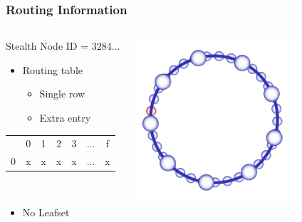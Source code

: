 \documentclass[xcolor=pdftex,dvipsnames,table]{beamer}
\begin{document}
\begin{frame}
    \frametitle{Routing Information}

    \begin{columns}

    \column{5.5cm}
    \begin{overlayarea}{\textwidth}{1\textheight}
    Stealth Node ID = 3284...

    \begin{itemize}
        \item{Routing table}
        \begin{itemize}
            \item{Single row}
            \item{Extra entry}
        \end{itemize}
    \end{itemize}

    \begin{tabular}{l!{\vrule}c c c c c c}
    \hline
      & 0 & 1 & 2 & 3 & ... & f\\
    0 & x & x & x & x & ... & x\\
    \end{tabular}

    ~\\
    \begin{itemize}
        \item{No Leafset}
    \end{itemize}

    \end{overlayarea}

    \column{5.5cm}
    \begin{center}
        \begin{overlayarea}{\textwidth}{\textheight}
            \includegraphics[width=6cm]{diagrams/StealthHighlight}
        \end{overlayarea}
    \end{center}

    \end{columns}
\end{frame}
\end{document}
